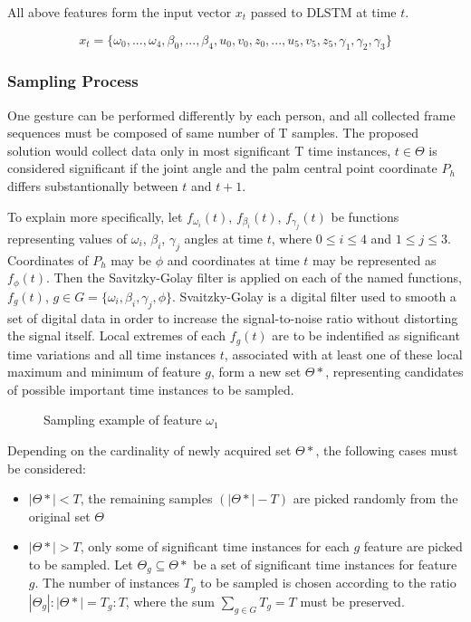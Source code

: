 All above features form the input vector $x_t$ passed to DLSTM at time $t$.

\begin{equation}
	{x_t = \{\omega_0, ...,\omega_4, \beta_0, ..., \beta_4, u_0,v_0,z_0, ..., u_5,v_5,z_5, \gamma_1, \gamma_2, \gamma_3\}}
\end{equation}

\subsubsection{Sampling Process}

One gesture can be performed differently by each person, and all collected frame sequences must be composed of same number of T samples. The proposed solution would collect data only in most significant T time instances, $t \in \Theta$ is considered significant if the joint angle and the palm central point coordinate $P_h$ differs substantionally between $t$ and $t+1$.

To explain more specifically, let $f_{\omega_i}(t)$, $f_{\beta_i}(t)$, $f_{\gamma_j}(t)$ be functions representing values of $\omega_i$, $\beta_i$, $\gamma_j$ angles at time $t$, where $0 \leq i \leq 4$ and $1 \leq j \leq 3$. Coordinates of $P_h$ may be $\phi$ and coordinates at time $t$ may be represented as $f_{\phi}(t)$. Then the Savitzky-Golay filter \cite{savitzkty} is applied on each of the named functions, $f_g(t)$, $g \in G = \{\omega_i,\beta_i, \gamma_j, \phi\}$. Svaitzky-Golay is a digital filter used to smooth a set of digital data in order to increase the signal-to-noise ratio without distorting the signal itself. Local extremes of each $f_g(t)$ are to be indentified as significant time variations and all time instances $t$, associated with at least one of these local maximum and minimum of feature $g$, form a new set $\Theta*$, representing candidates of possible important time instances to be sampled. 

\begin{figure}[h]
	\centering
    \qquad
    \caption{Sampling example of feature $\omega_1$}
\end{figure}

Depending on the cardinality of newly acquired set $\Theta*$, the following cases must be considered:

\begin{itemize}
	\item $|\Theta*| < T$, the remaining samples $(|\Theta*|-T)$ are picked randomly from the original set $\Theta$
	\item $|\Theta*| > T$, only some of significant time instances for each $g$ feature are picked to be sampled. Let $\Theta_g \subseteq \Theta*$ be a set of significant time instances for feature $g$. The number of instances $T_g$ to be sampled is chosen according to the ratio $|\Theta_g|:|\Theta*| = T_g:T$, where the sum $\sum_{g \in G}{T_g} = T$ must be preserved.\cite{avola}
\end{itemize}


